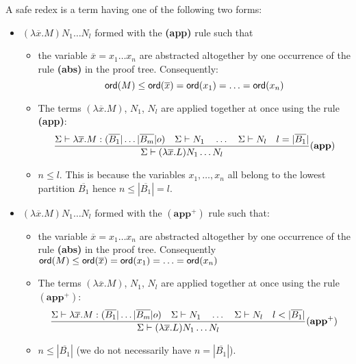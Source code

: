 \begin{dfn}
A safe redex is a term having one of the following two forms:

\begin{itemize}
    \item $(\lambda \overline{x} . M) N_1 \ldots N_l$ formed with the \textbf{(app)} rule such that
        \begin{itemize}
        \item the variable $\overline{x}=x_1\ldots x_n$ are abstracted altogether by one occurrence of the rule \textbf{(abs)} in the proof tree.
                Consequently:
                $${\sf ord}(M) \leq {\sf ord}(\overline{x}) = {\sf ord}(x_1) = \ldots = {\sf ord}(x_n)$$

        \item The terms $(\lambda \overline{x} . M)$, $N_1$, $N_l$ are applied together at once using the rule \textbf{(app)}:
        $$   \frac{\displaystyle 
                    \Sigma \vdash \lambda \overline{x} . M : (\overline{B_1}|\ldots|\overline{B_m}|o)
                    \quad
                    \Sigma \vdash N_1         \quad \ldots \quad \Sigma \vdash N_l
                    \quad l = |\overline{B_1}|
            }{
            \Sigma \vdash (\lambda \overline{x} . L) N_1 \ldots N_l
            } (\mathbf{app})
        $$

        \item $n \leq l$. This is because the variables $x_1, \ldots, x_n$ all belong to the lowest partition $\overline{B_1}$ hence $n\leq |\overline{B_1}| = l$.

        \end{itemize}

\item $(\lambda \overline{x} . M) N_1 \ldots N_l$ formed with the $\mathbf{(app^+)}$ rule such that:

        \begin{itemize}
        \item the variable $\overline{x}=x_1\ldots x_n$ are abstracted altogether by one occurrence of the rule \textbf{(abs)} in the proof tree.
                Consequently  ${\sf ord}(M) \leq {\sf ord}(\overline{x}) = {\sf ord}(x_1) = \ldots = {\sf ord}(x_n)$

        \item The terms $(\lambda \overline{x} . M)$, $N_1$, $N_l$ are applied together at once using the rule $\mathbf{(app^+)}$:
        $$   \frac{\displaystyle 
                    \Sigma \vdash \lambda \overline{x} . M : (\overline{B_1}|\ldots|\overline{B_m}|o)
                    \quad
                    \Sigma \vdash N_1         \quad \ldots \quad \Sigma \vdash N_l
                    \quad l < |\overline{B_1}|
            }{
            \Sigma \vdash (\lambda \overline{x} . L) N_1 \ldots N_l
            } (\mathbf{app^+})
        $$

      \item $n \leq |\overline{B_1}|$ (we do not necessarily have $n = |\overline{B_1}|$).

        \end{itemize}

\end{itemize}
\end{dfn}


